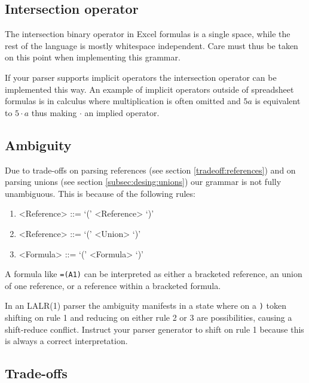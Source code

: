 \documentclass[conference]{IEEEtran}
\begin{document}
\subsection{Intersection operator}

The intersection binary operator in Excel formulas is a single space, while the rest of the language is mostly whitespace independent.
Care must thus be taken on this point when implementing this grammar.

If your parser supports implicit operators the intersection operator can be implemented this way.
An example of implicit operators outside of spreadsheet formulas is in calculus where multiplication is often omitted and $5a$ is equivalent to $5 \cdot a$ thus making $\cdot$ an implied operator.

\subsection{Ambiguity}

Due to trade-offs on parsing references (see section \ref{tradeoff:references}) and on parsing unions (see section \ref{subsec:desing:unions}) our grammar is not fully unambiguous.
This is because of the following rules:
\begin{enumerate}
\item \begin{grammar}<Reference> ::= `(' <Reference> `)'\end{grammar}
\item \begin{grammar}<Reference> ::= `(' <Union> `)'\end{grammar}
\item \begin{grammar}<Formula> ::= `(' <Formula> `)'\end{grammar}
\end{enumerate}

A formula like \texttt{=(A1)} can be interpreted as either a bracketed reference, an union of one reference, or a reference within a bracketed formula.

In an LALR(1) parser the ambiguity manifests in a state where on a \texttt{)} token shifting on rule 1 and reducing on either rule 2 or 3 are possibilities, causing a shift-reduce conflict.
Instruct your parser generator to shift on rule 1 because this is always a correct interpretation.

\subsection{Trade-offs}
\end{document}
